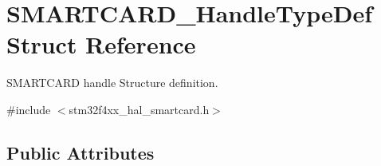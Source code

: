 \hypertarget{struct_s_m_a_r_t_c_a_r_d___handle_type_def}{}\section{S\+M\+A\+R\+T\+C\+A\+R\+D\+\_\+\+Handle\+Type\+Def Struct Reference}
\label{struct_s_m_a_r_t_c_a_r_d___handle_type_def}


S\+M\+A\+R\+T\+C\+A\+RD handle Structure definition.  




{\ttfamily \#include $<$stm32f4xx\+\_\+hal\+\_\+smartcard.\+h$>$}

\subsection*{Public Attributes}
